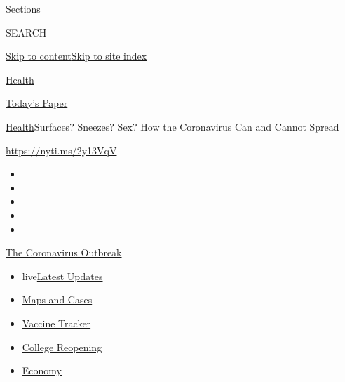 Sections

SEARCH

\protect\hyperlink{site-content}{Skip to
content}\protect\hyperlink{site-index}{Skip to site index}

\href{https://www.nytimes.com/section/health}{Health}

\href{https://myaccount.nytimes.com/auth/login?response_type=cookie\&client_id=vi}{}

\href{https://www.nytimes.com/section/todayspaper}{Today's Paper}

\href{/section/health}{Health}\textbar{}Surfaces? Sneezes? Sex? How the
Coronavirus Can and Cannot Spread

\url{https://nyti.ms/2y13VqV}

\begin{itemize}
\item
\item
\item
\item
\item
\end{itemize}

\href{https://www.nytimes.com/news-event/coronavirus?action=click\&pgtype=Article\&state=default\&region=TOP_BANNER\&context=storylines_menu}{The
Coronavirus Outbreak}

\begin{itemize}
\tightlist
\item
  live\href{https://www.nytimes.com/2020/08/04/world/coronavirus-cases.html?action=click\&pgtype=Article\&state=default\&region=TOP_BANNER\&context=storylines_menu}{Latest
  Updates}
\item
  \href{https://www.nytimes.com/interactive/2020/us/coronavirus-us-cases.html?action=click\&pgtype=Article\&state=default\&region=TOP_BANNER\&context=storylines_menu}{Maps
  and Cases}
\item
  \href{https://www.nytimes.com/interactive/2020/science/coronavirus-vaccine-tracker.html?action=click\&pgtype=Article\&state=default\&region=TOP_BANNER\&context=storylines_menu}{Vaccine
  Tracker}
\item
  \href{https://www.nytimes.com/2020/08/02/us/covid-college-reopening.html?action=click\&pgtype=Article\&state=default\&region=TOP_BANNER\&context=storylines_menu}{College
  Reopening}
\item
  \href{https://www.nytimes.com/live/2020/08/04/business/stock-market-today-coronavirus?action=click\&pgtype=Article\&state=default\&region=TOP_BANNER\&context=storylines_menu}{Economy}
\end{itemize}

